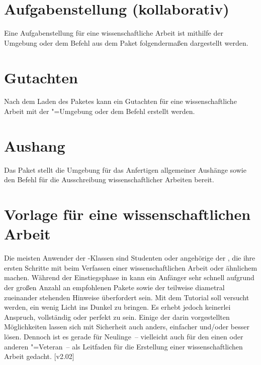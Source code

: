 \section{Aufgabenstellung (kollaborativ)}
\label{sec:exmpl:task}
Eine Aufgabenstellung für eine wissenschaftliche Arbeit ist mithilfe der 
Umgebung  oder dem Befehl  aus dem Paket 
 folgendermaßen dargestellt werden.

\section{Gutachten}
\label{sec:exmpl:evaluation}
Nach dem Laden des Paketes  kann ein Gutachten für 
eine wissenschaftliche Arbeit mit der "=Umgebung oder 
dem Befehl  erstellt werden.

\section{Aushang}
\label{sec:exmpl:notice}
Das Paket  stellt die Umgebung  
für das Anfertigen allgemeiner Aushänge sowie den Befehl  
für die Ausschreibung wissenschaftlicher Arbeiten bereit.

\section{Vorlage für eine wissenschaftlichen Arbeit}
\label{sec:exmpl:treatise}
Die meisten Anwender der \TUDScript-Klassen sind Studenten oder angehörige der 
\TnUD, die ihre ersten Schritte mit  beim Verfassen einer 
wissenschaftlichen Arbeit oder ähnlichem machen. Während der Einstiegsphase in 
 kann ein Anfänger sehr schnell aufgrund der großen Anzahl an 
empfohlenen Pakete sowie der teilweise diametral zueinander stehenden Hinweise 
überfordert sein. Mit dem Tutorial  soll versucht werden, 
ein wenig Licht ins Dunkel zu bringen. Es erhebt jedoch keinerlei Anspruch, 
vollständig oder perfekt zu sein. Einige der darin vorgestellten Möglichkeiten 
lassen sich mit Sicherheit auch anders, einfacher und/oder besser lösen. 
Dennoch ist es gerade für Neulinge~-- vielleicht auch für den einen oder 
anderen "=Veteran~-- als Leitfaden für die Erstellung einer 
wissenschaftlichen Arbeit gedacht.
[v2.02]

